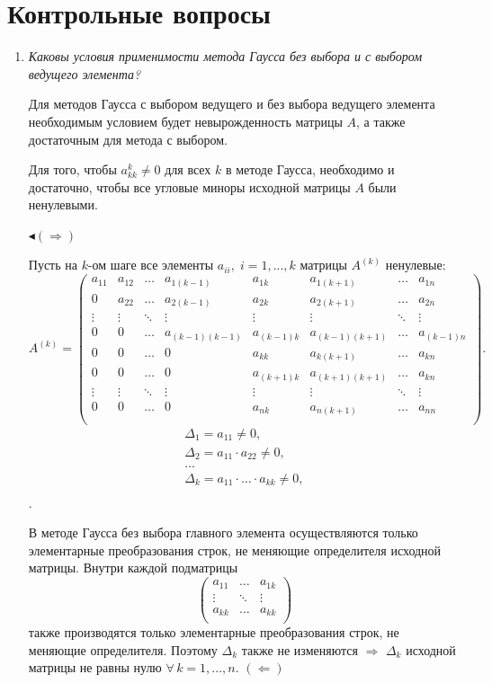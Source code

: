 \documentclass[12pt, a4paper]{article}
\begin{document}
	\section{Контрольные вопросы}
	\begin{enumerate}
		\item \textit{Каковы условия применимости метода Гаусса без выбора и с выбором ведущего элемента?}
		
		Для методов Гаусса с выбором ведущего и без выбора ведущего элемента необходимым условием будет невырожденность матрицы $A$, а также достаточным для метода с выбором.
		
		Для того, чтобы $a_{kk}^k \ne 0$ для всех $k$ в методе Гаусса, необходимо и достаточно, чтобы все угловые миноры исходной матрицы $A$ были ненулевыми.
		
		$\blacktriangleleft (\Rightarrow)$
		
		Пусть на $k$-ом шаге все элементы $a_{ii}, \; i=1,...,k$ матрицы $A^{(k)}$ ненулевые:
		$$ A^{(k)} = 
		\begin{pmatrix}
			a_{11} & a_{12} & \ldots & a_{1(k-1)} & a_{1k} & a_{1(k+1)} & \ldots & a_{1n}\\
			0 & a_{22} & \ldots & a_{2(k-1)} & a_{2k} & a_{2(k+1)} & \ldots & a_{2n}\\
			\vdots & \vdots & \ddots & \vdots & \vdots & \vdots & \ddots & \vdots\\
			0 & 0 & \ldots & a_{(k-1)(k-1)} & a_{(k-1)k} & a_{(k-1)(k+1)} & \ldots & a_{(k-1)n}\\
			0 & 0 & \ldots & 0 & a_{kk} & a_{k(k+1)} & \ldots & a_{kn}\\
			0 & 0 & \ldots & 0 & a_{(k+1)k} & a_{(k+1)(k+1)} & \ldots & a_{kn}\\
			\vdots & \vdots & \ddots & \vdots & \vdots & \vdots & \ddots & \vdots\\
			0 & 0 & \ldots & 0 & a_{nk} & a_{n(k+1)} & \ldots & a_{nn}\\
		\end{pmatrix}.
		$$
		\begin{gather*}
			\Delta_1 = a_{11} \ne 0,\\
			\Delta_2 = a_{11} \cdot a_{22} \ne 0,\\
			\ldots \\
			\Delta_k = a_{11} \cdot \ldots \cdot a_{kk} \ne 0,\\
		\end{gather*}.
		
		В методе Гаусса без выбора главного элемента осуществляются только элементарные преобразования строк, не меняющие определителя исходной матрицы. Внутри каждой подматрицы 
		$$
		\begin{pmatrix}
			a_{11} & \ldots & a_{1k}\\
			\vdots & \ddots & \vdots\\
			a_{kk} & \ldots & a_{kk}\\
		\end{pmatrix}
		$$
		также производятся только элементарные преобразования строк, не меняющие определителя. Поэтому $\Delta_k$ также не изменяются $\Longrightarrow$ $\Delta_k$ исходной матрицы не равны нулю $\forall \, k=1,...,n$.
		\newpage
		$(\Leftarrow)$
		

\end{enumerate}
\end{document}
